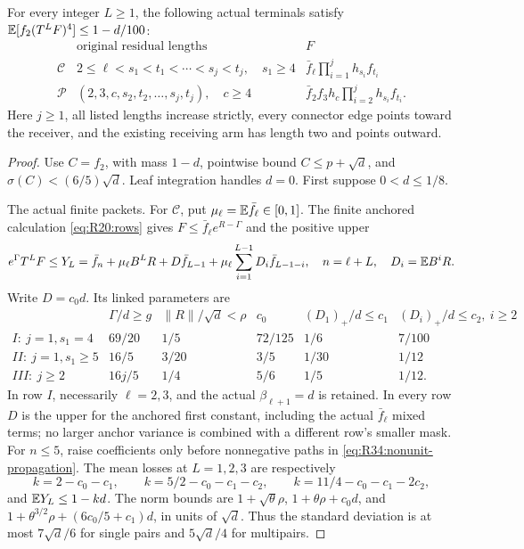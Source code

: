 \begin{lemma}\label{lem:R34:nonunit-odd}
For every integer \(L\ge1\), the following actual terminals satisfy
\(\mathbb E[f_2(T^LF)^4]\le1-d/100\):
\[
\begin{array}{c|l|l}
 &\text{original residual lengths}&F\\\hline
\mathcal C&2\le\ell<s_1<t_1<\cdots<s_j<t_j,\quad s_1\ge4
 &\bar f_\ell\prod_{i=1}^j h_{s_i}f_{t_i}\\
\mathcal P&(2,3,c,s_2,t_2,\ldots,s_j,t_j),\quad c\ge4
 &\bar f_2 f_3h_c\prod_{i=2}^j h_{s_i}f_{t_i}.
\end{array}
\]
Here \(j\ge1\), all listed lengths increase strictly, every connector
edge points toward the receiver, and the existing receiving arm has
length two and points outward.
\end{lemma}
\begin{proof}
Use \(C=f_2\), with mass \(1-d\), pointwise bound
\(C\le p+\sqrt d\), and \(\sigma(C)<(6/5)\sqrt d\).
Leaf integration handles \(d=0\). First suppose \(0<d\le1/8\).

The actual finite packets. For \(\mathcal C\), put
\(\mu_\ell=\mathbb E\bar f_\ell\in[0,1]\).
The finite anchored calculation \eqref{eq:R20:rows} gives
\(F\le\bar f_\ell e^{R-\Gamma}\) and the positive upper
\begin{equation}\label{eq:R34:nonunit-propagation}
 e^\Gamma T^LF\le Y_L=\bar f_n+\mu_\ell B^LR+D\bar f_{L-1}
     +\mu_\ell\sum_{i=1}^{L-1}D_i\bar f_{L-1-i},
 \quad n=\ell+L,\quad D_i=\mathbb E B^iR.
\end{equation}
Write \(D=c_0d\). Its linked parameters are
\[
\begin{array}{c|c|c|c|c|c}
 &\Gamma/d\ge g&\|R\|/\sqrt d<\rho&c_0&(D_1)_+/d\le c_1
 &(D_i)_+/d\le c_2,\ i\ge2\\\hline
I:\ j=1,s_1=4&69/20&1/5&72/125&1/6&7/100\\
II:\ j=1,s_1\ge5&16/5&3/20&3/5&1/30&1/12\\
III:\ j\ge2&16j/5&1/4&5/6&1/5&1/12.
\end{array}
\]
In row \(I\), necessarily \(\ell=2,3\), and the actual
\(\beta_{\ell+1}=d\) is retained. In every row \(D\) is the
upper for the anchored first constant, including the actual
\(\bar f_\ell\) mixed terms; no larger anchor variance is combined
with a different row's smaller mask.
For \(n\le5\), raise coefficients only before nonnegative paths in
\eqref{eq:R34:nonunit-propagation}. The mean losses at
\(L=1,2,3\) are respectively
\[
 k=2-c_0-c_1,\qquad
 k=5/2-c_0-c_1-c_2,\qquad
 k=11/4-c_0-c_1-2c_2,
\]
and \(\mathbb E Y_L\le1-kd\).
The norm bounds are \(1+\sqrt\theta\rho\),
\(1+\theta\rho+c_0d\), and
\(1+\theta^{3/2}\rho+(6c_0/5+c_1)d\), in units of \(\sqrt d\).
Thus the standard deviation is at most \(7\sqrt d/6\) for
single pairs and \(5\sqrt d/4\) for multipairs.


\end{proof}
